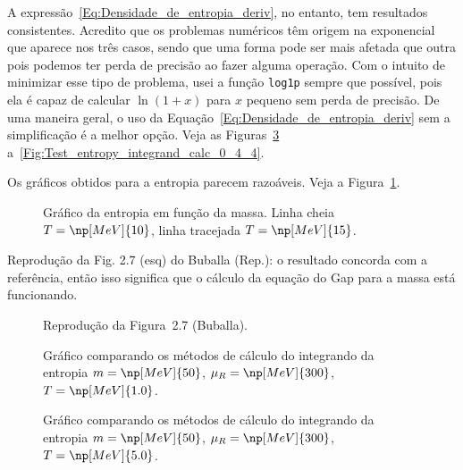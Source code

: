 A expressão~\eqref{Eq:Densidade_de_entropia_deriv}, no entanto, tem resultados consistentes. Acredito que os problemas numéricos têm origem na exponencial que aparece nos três casos, sendo que uma forma pode ser mais afetada que outra pois podemos ter perda de precisão ao fazer alguma operação. Com o intuito de minimizar esse tipo de problema, usei a função \texttt{log1p} sempre que possível, pois ela é capaz de calcular $\ln(1 + x)$ para $x$ pequeno sem perda de precisão. De uma maneira geral, o uso da Equação~\eqref{Eq:Densidade_de_entropia_deriv} sem a simplificação é a melhor opção. Veja as Figuras~\ref{Fig:Test_entropy_integrand_calc_0_3_0} a~\ref{Fig:Test_entropy_integrand_calc_0_4_4}.

Os gráficos obtidos para a entropia parecem razoáveis. Veja a Figura~\ref{Fig:Entropia}.

\begin{figure}
	
	\caption{Gráfico da entropia em função da massa. Linha cheia $T = \np[MeV]{10}$, linha tracejada $T = \np[MeV]{15}$. \protect}
	\label{Fig:Entropia}
\end{figure}

Reprodução da Fig. 2.7 (esq) do Buballa (Rep.): o resultado concorda com a referência, então isso significa que o cálculo da equação do Gap para a massa está funcionando.
\begin{figure}
	
	\caption{Reprodução da Figura~2.7 (Buballa). \protect}
	\label{Fig:Buballa_rep_2.7}
\end{figure}



\begin{figure}
	
	\caption{Gráfico comparando os métodos de cálculo do integrando da entropia $m = \np[MeV]{50}$, $\mu_R = \np[MeV]{300}$, $T = \np[MeV]{1.0}$. \protect}
	\label{Fig:Test_entropy_integrand_calc_0_3_0}
\end{figure}

\begin{figure}
	
	\caption{Gráfico comparando os métodos de cálculo do integrando da entropia $m = \np[MeV]{50}$, $\mu_R = \np[MeV]{300}$, $T = \np[MeV]{5.0}$. \protect}
	\label{Fig:Test_entropy_integrand_calc_0_3_1}
\end{figure}

